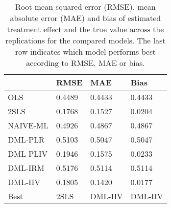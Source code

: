 \begin{table}[H]
\centering
\caption{Root mean squared error (RMSE), mean absolute error (MAE) and bias of estimated treatment effect and the true value across the replications for the compared models. The last row indicates which model performs best according to RMSE, MAE or bias.}
\label{Scenario4}
\begin{tabular}{L{3.3333333333333335cm}L{2.6666666666666665cm}R{2.0cm}R{2.6666666666666665cm}}
\toprule
 & RMSE & MAE & Bias \\
\midrule
OLS & 0.4489 & 0.4433 & 0.4433 \\
2SLS & 0.1768 & 0.1527 & 0.0204 \\
NAIVE-ML & 0.4926 & 0.4867 & 0.4867 \\
DML-PLR & 0.5103 & 0.5047 & 0.5047 \\
DML-PLIV & 0.1946 & 0.1575 & 0.0233 \\
DML-IRM & 0.5176 & 0.5114 & 0.5114 \\
DML-IIV & 0.1805 & 0.1420 & 0.0177 \\
Best & 2SLS & DML-IIV & DML-IIV \\
\bottomrule
\end{tabular}
\end{table}
